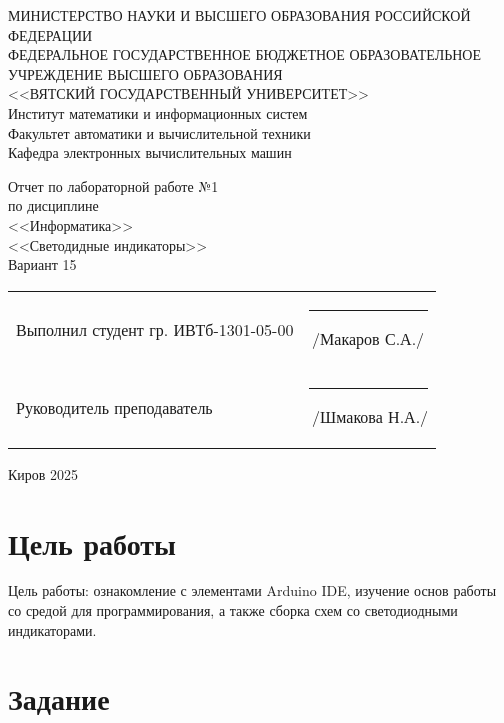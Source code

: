 \documentclass[a4paper,14pt]{extarticle}
\begin{document}
  \newpage\thispagestyle{empty}
  \begin{center}
    \MakeUppercase{
      Министерство науки и высшего образования Российской Федерации\\
      Федеральное государственное бюджетное образовательное учреждение высшего образования\\
      <<Вятский Государственный Университет>>\\
    }
    Институт математики и информационных систем\\
    Факультет автоматики и вычислительной техники\\
    Кафедра электронных вычислительных машин
  \end{center}
  \vfill
  
  \begin{center}
    Отчет по лабораторной работе №1\\
    по дисциплине\\
    <<Информатика>>\\
    <<Светодидные индикаторы>>\\
    Вариант 15
  \end{center}
  \vfill
  
  \noindent
  \begin{tabular}{ll}
    Выполнил студент гр. ИВТб-1301-05-00 \hspace{5mm} &
    \rule[-1mm]{25mm}{0.10mm}\,/Макаров С.А./\\
    
    Руководитель преподаватель & \rule[-1mm]{25mm}{0.10mm}\,/Шмакова Н.А./\\
  \end{tabular}
  
  \vfill
  \begin{center}
    Киров 2025
  \end{center}

  \newpage
  \section*{\hspace{12.5mm}Цель работы}
  Цель работы: ознакомление с элементами Arduino IDE, изучение основ
  работы со средой для программирования, а также сборка схем со
  светодиодными индикаторами.

  \section*{\hspace{12.5mm}Задание}
\end{document}
